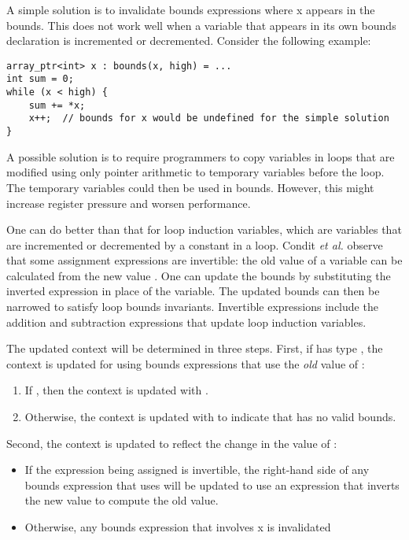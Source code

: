 A simple solution is to invalidate bounds expressions where x appears in
the bounds. This does not work well when a variable that appears in its
own bounds declaration is incremented or decremented. Consider the
following example:
\begin{verbatim}
array_ptr<int> x : bounds(x, high) = ...
int sum = 0;
while (x < high) {
    sum += *x;
    x++;  // bounds for x would be undefined for the simple solution
}
\end{verbatim}

A possible solution is to require programmers to copy variables in loops
that are modified using only pointer arithmetic to temporary variables
before the loop. The temporary variables could then be used in bounds.
However, this might increase register pressure and worsen performance.

One can do better than that for loop induction variables, which are
variables that are incremented or decremented by a constant in a loop.
Condit \textit{et al.} observe that some assignment expressions are
invertible: the old value of a variable can be calculated from the new
value . One can update the bounds by substituting the inverted
expression in place of the variable. The updated bounds can then be
narrowed to satisfy loop bounds invariants. Invertible expressions
include the addition and subtraction expressions that update loop
induction variables.

The updated context will be determined in three steps. First, if
 has type \arrayptr, the context is updated for
 using bounds expressions that use the \emph{old} value of :

\begin{enumerate}
\item
  If , then the context is updated with
  .
\item
  Otherwise, the context is updated with 
   to indicate that  has no valid bounds.
\end{enumerate}

Second, the context is updated to reflect the change in the value of
:

\begin{itemize}
\item
  If the expression being assigned is invertible, the right-hand side of
  any bounds expression that uses  will be updated to use an
  expression that inverts the new value to compute the old value.
\item
  Otherwise, any bounds expression that involves x is invalidated
\end{itemize}

